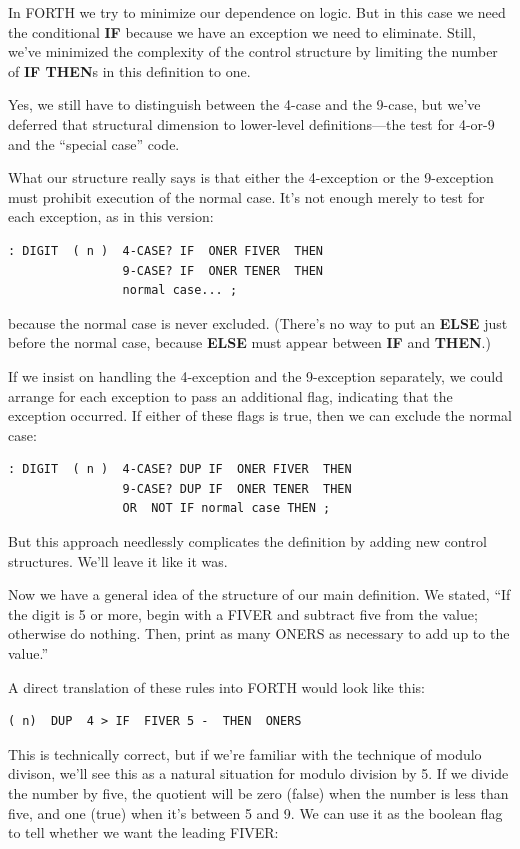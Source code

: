 In FORTH we try to minimize our dependence on logic. But in this
case we need the conditional \textbf{IF} because we have an exception we need to
eliminate. Still, we've minimized the complexity of the control structure
by limiting the number of \textbf{IF THEN}s in this definition to one.

Yes, we still have to distinguish between the 4-case and the 9-case,
but we've deferred that structural dimension to lower-level
definitions---the test for 4-or-9 and the ``special case'' code.

What our structure really says is that either the 4-exception or the
9-exception must prohibit execution of the normal case. It's not enough
merely to test for each exception, as in this version:

\begin{verbatim}
: DIGIT  ( n )  4-CASE? IF  ONER FIVER  THEN
                9-CASE? IF  ONER TENER  THEN
                normal case... ;
\end{verbatim}

because the normal case is never excluded. (There's no way to put an
\textbf{ELSE} just before the normal case, because \textbf{ELSE} must appear between
\textbf{IF} and \textbf{THEN}.)

If we insist on handling the 4-exception and the 9-exception
separately, we could arrange for each exception to pass an additional
flag, indicating that the exception occurred. If either of these flags is
true, then we can exclude the normal case:

\begin{verbatim}
: DIGIT  ( n )  4-CASE? DUP IF  ONER FIVER  THEN
                9-CASE? DUP IF  ONER TENER  THEN
                OR  NOT IF normal case THEN ;
\end{verbatim}
But this approach needlessly complicates the definition by adding new
control structures. We'll leave it like it was.

Now we have a general idea of the structure of our main definition.
We stated, ``If the digit is 5 or more, begin with a FIVER and subtract
five from the value; otherwise do nothing. Then, print as many
ONERS as necessary to add up to the value.''

A direct translation of these rules into FORTH would look like this:

\begin{verbatim}
( n)  DUP  4 > IF  FIVER 5 -  THEN  ONERS
\end{verbatim}
This is technically correct, but if we're familiar with the technique of
modulo divison, we'll see this as a natural situation for modulo division
by 5. If we divide the number by five, the quotient will be zero (false)
when the number is less than five, and one (true) when it's between 5 and
9. We can use it as the boolean flag to tell whether we want the leading
FIVER:

